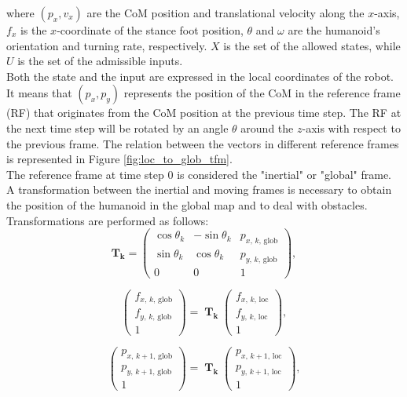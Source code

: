 \documentclass[main.tex]{subfiles}
\begin{document}
where $(p_x, v_x)$ are the CoM position and translational velocity along the $x$-axis, $f_x$ is the $x$-coordinate of the stance foot position, $\theta$ and $\omega$ are the humanoid's orientation and turning rate, respectively. $X$ is the set of the allowed states, while $U$ is the set of the admissible inputs.\\
Both the state and the input are expressed in the local coordinates of the robot. It means that $(p_x, p_y)$ represents the position of the CoM in the reference frame (RF) that originates from the CoM position at the previous time step. The RF at the next time step will be rotated by an angle $\theta$ around the $z$-axis with respect to the previous frame. The relation between the vectors in different reference frames is represented in Figure \ref{fig:loc_to_glob_tfm}.\\
The reference frame at time step 0 is considered the "inertial" or "global" frame. A transformation between the inertial and moving frames is necessary to obtain the position of the humanoid in the global map and to deal with obstacles. Transformations are performed as follows:
$$
\mathbf{T_k} = \begin{pmatrix}
\cos\theta_k & -\sin\theta_k & p_{x,\,k,\,\text{glob}} \\
\sin\theta_k & \cos\theta_k &  p_{y,\,k,\,\text{glob}} \\
0 & 0 & 1
\end{pmatrix},
$$

$$
\begin{pmatrix} f_{x,\,k,\,\text{glob} } \\ f_{y,\,k,\,\text{glob}} \\ 1 \end{pmatrix} = \; \mathbf{T_k} \;
\begin{pmatrix}
f_{x,\,k,\,\text{loc} } \\ f_{y,\,k,\,\text{loc}} \\ 1
\end{pmatrix},
$$

$$
\begin{pmatrix} p_{x,\,k+1,\,\text{glob} } \\ p_{y,\,k+1,\,\text{glob}} \\ 1 \end{pmatrix} = \; \mathbf{T_k} \;
\begin{pmatrix}
p_{x,\,k+1,\,\text{loc} } \\ p_{y,\,k+1,\,\text{loc}} \\ 1
\end{pmatrix},
$$
\end{document}
